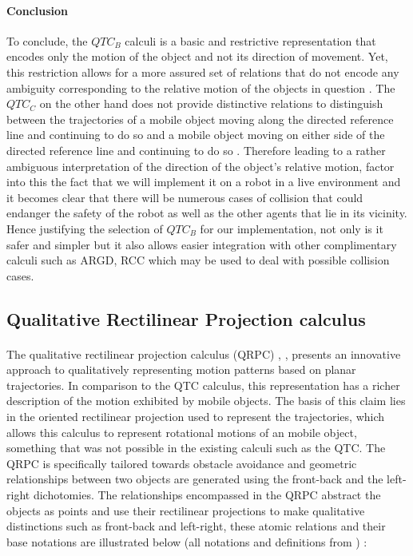 	\paragraph{Conclusion}To conclude, the $QTC_B$ calculi is a basic and restrictive representation that encodes only the motion of the object and not its direction of movement. Yet, this restriction allows for a more assured set of relations that do not encode any ambiguity corresponding to the relative motion of the objects in question \cite{van2004representing}. The $QTC_C$ on the other hand does not provide distinctive relations to distinguish between the trajectories of a mobile object moving along the directed reference line and continuing to do so and a mobile object moving on either side of the directed reference line and continuing to do so \cite{van2005qualitative}. Therefore leading to a rather ambiguous interpretation of the direction of the object's relative motion, factor into this the fact that we will implement it on a robot in a live environment and it becomes clear that there will be numerous cases of collision that could endanger the safety of the robot as well as the other agents that lie in its vicinity.  Hence justifying the selection of $QTC_B$ for our implementation, not only is it safer and simpler but it also allows easier integration with other complimentary calculi such as ARGD, RCC which may be used to deal with possible collision cases.

	\subsection{Qualitative Rectilinear Projection calculus}
	\paragraph{}The qualitative rectilinear projection calculus (QRPC) \cite{glez2013qrpc}, \cite{alvarez2006guide},  \cite{delafontaine2011implementing} presents an innovative approach to qualitatively representing motion patterns based on planar trajectories. In comparison to the QTC calculus, this representation has a richer description of the motion exhibited by mobile objects. The basis of this claim lies in the oriented rectilinear projection used to represent the trajectories, which allows this calculus to represent rotational motions of an mobile object, something that was not possible in the existing calculi such as the QTC. The QRPC is specifically tailored towards obstacle avoidance and geometric relationships between two objects are generated using the front-back and the left-right dichotomies. The relationships encompassed in the QRPC abstract the objects as points and use their rectilinear projections to make qualitative distinctions such as front-back and left-right, these atomic relations and their base notations are illustrated below (all notations and definitions from \cite{glez2013qrpc}) :
	
